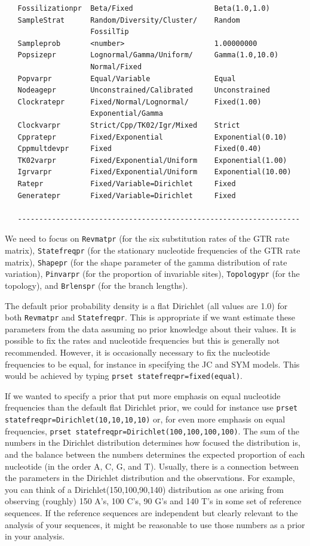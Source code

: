\documentclass[12pt]{book}
\begin{document}
\begin{singlespacing}
\begin{verbatim}
   Fossilizationpr  Beta/Fixed                   Beta(1.0,1.0)
   SampleStrat      Random/Diversity/Cluster/    Random
                    FossilTip
   Sampleprob       <number>                     1.00000000
   Popsizepr        Lognormal/Gamma/Uniform/     Gamma(1.0,10.0)
                    Normal/Fixed
   Popvarpr         Equal/Variable               Equal
   Nodeagepr        Unconstrained/Calibrated     Unconstrained
   Clockratepr      Fixed/Normal/Lognormal/      Fixed(1.00)
                    Exponential/Gamma
   Clockvarpr       Strict/Cpp/TK02/Igr/Mixed    Strict
   Cppratepr        Fixed/Exponential            Exponential(0.10)
   Cppmultdevpr     Fixed                        Fixed(0.40)
   TK02varpr        Fixed/Exponential/Uniform    Exponential(1.00)
   Igrvarpr         Fixed/Exponential/Uniform    Exponential(10.00)
   Ratepr           Fixed/Variable=Dirichlet     Fixed
   Generatepr       Fixed/Variable=Dirichlet     Fixed

   ------------------------------------------------------------------
\end{verbatim}
\normalsize
\end{singlespacing}

We need to focus on \texttt{Revmatpr} (for the six substitution rates of the GTR rate matrix),
\texttt{Statefreqpr} (for the stationary nucleotide frequencies of the GTR rate matrix),
\texttt{Shapepr} (for the shape parameter of the gamma distribution of rate variation),
\texttt{Pinvarpr} (for the proportion of invariable sites), \texttt{Topologypr} (for the topology),
and \texttt{Brlenspr} (for the branch lengths).

The default prior probability density is a flat Dirichlet (all values are 1.0) for both
\texttt{Revmatpr} and \texttt{Statefreqpr}. This is appropriate if we want estimate these
parameters from the data assuming no prior knowledge about their values. It is possible to fix the
rates and nucleotide frequencies but this is generally not recommended. However, it is occasionally
necessary to fix the nucleotide frequencies to be equal, for instance in specifying the JC and SYM
models. This would be achieved by typing \texttt{prset statefreqpr=fixed(equal)}.

If we wanted to specify a prior that put more emphasis on equal nucleotide
frequencies than the default flat Dirichlet prior, we could for instance use
\texttt{prset statefreqpr=Dirichlet(10,10,10,10)} or, for even more emphasis on
equal frequencies, \texttt{prset statefreqpr=Dirichlet(100,100,100,100)}. The
sum of the numbers in the Dirichlet distribution determines how focused the
distribution is, and the balance between the numbers determines the expected
proportion of each nucleotide (in the order A, C, G, and T). Usually, there is
a connection between the parameters in the Dirichlet distribution and the
observations. For example, you can think of a Dirichlet(150,100,90,140)
distribution as one arising from observing (roughly) 150 A's, 100 C's, 90 G's
and 140 T's in some set of reference sequences. If the reference sequences are
independent but clearly relevant to the analysis of your sequences, it might be
reasonable to use those numbers as a prior in your analysis. 
\end{document}
